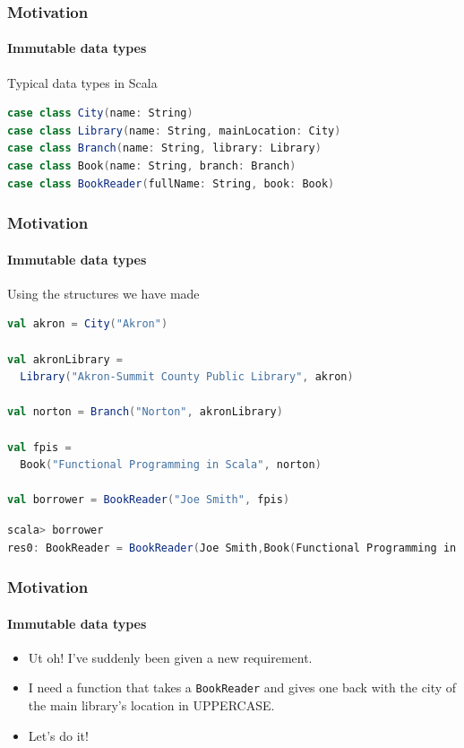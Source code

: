 \documentclass{beamer}
\begin{document}
\begin{frame}[fragile]
  \frametitle{Motivation}
  \framesubtitle{Immutable data types}
  \begin{block}{Typical data types in Scala}
    \begin{lstlisting}[language=scala]
case class City(name: String)
case class Library(name: String, mainLocation: City)
case class Branch(name: String, library: Library)
case class Book(name: String, branch: Branch)
case class BookReader(fullName: String, book: Book)
    \end{lstlisting}
  \end{block}
\end{frame}

\begin{frame}[fragile]
  \frametitle{Motivation}
  \framesubtitle{Immutable data types}
  \begin{block}{Using the structures we have made}
    \begin{lstlisting}[language=scala]
val akron = City("Akron")

val akronLibrary =
  Library("Akron-Summit County Public Library", akron)

val norton = Branch("Norton", akronLibrary)

val fpis =
  Book("Functional Programming in Scala", norton)

val borrower = BookReader("Joe Smith", fpis)
    \end{lstlisting}
    \begin{lstlisting}[language=scala]
scala> borrower
res0: BookReader = BookReader(Joe Smith,Book(Functional Programming in Scala,Branch(Norton,Library(Akron-Summit County Public Library,City(Akron)))))
    \end{lstlisting}
  \end{block}
\end{frame}

\begin{frame}[fragile]
  \frametitle{Motivation}
  \framesubtitle{Immutable data types}
  \begin{itemize}
    \item Ut oh! I've suddenly been given a new requirement.
    \item I need a function that takes a \texttt{BookReader} and gives one back with the city of the main library's location in UPPERCASE.
    \item Let's do it!
  \end{itemize}
\end{frame}
\end{document}
